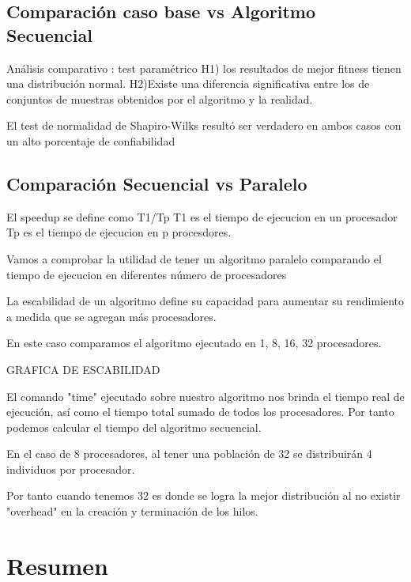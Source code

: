 \subsection{Comparación caso base vs Algoritmo Secuencial}
Análisis comparativo : test paramétrico
H1)  los  resultados  de  mejor  fitness  tienen  una distribución normal.
H2)Existe  una  diferencia  significativa  entre  los  de conjuntos  de  muestras  obtenidos  por  el  algoritmo  y  la realidad.

El  test  de  normalidad  de  Shapiro-Wilks  resultó  ser verdadero  en  ambos  casos  con  un  alto  porcentaje  de
confiabilidad



\subsection{Comparación Secuencial vs  Paralelo}

El speedup se define como T1/Tp
T1 es el tiempo de ejecucion en un procesador
Tp es el tiempo de ejecucion en p procesdores.


Vamos a comprobar la utilidad de tener un algoritmo paralelo comparando el tiempo de ejecucion en diferentes número de procesadores

La escabilidad de un algoritmo define su capacidad para aumentar su rendimiento a medida que se agregan más procesadores.

En este caso comparamos el algoritmo ejecutado en 1, 8, 16, 32 procesadores.

GRAFICA DE ESCABILIDAD

El comando "time" ejecutado sobre nuestro algoritmo nos brinda el tiempo real de ejecución, así como el tiempo total sumado de todos los procesadores. Por tanto podemos calcular el tiempo del algoritmo secuencial.

En el caso de 8 procesadores, al tener una población de 32 se distribuirán 4 individuos por procesador.

Por tanto cuando tenemos 32 es donde se logra la mejor distribución al no existir "overhead" en la creación y terminación de los hilos.


\section{Resumen}

